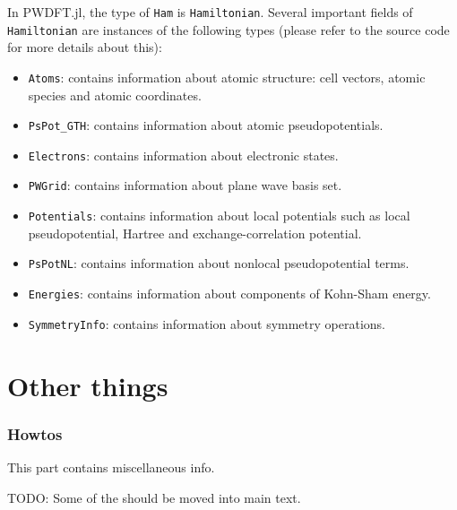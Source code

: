\documentclass[a4paper,fleqn]{article}
\newcommand{\jlinline}[1]{\texttt{#1}}
\begin{document}
In \textsf{PWDFT.jl}, the type of \jlinline{Ham} is \jlinline{Hamiltonian}.
Several important fields of \jlinline{Hamiltonian} are instances of the following
types (please refer to the source code for more details about this):
\begin{itemize}
\item \jlinline{Atoms}: contains information about atomic structure: cell
vectors, atomic species and atomic coordinates.
\item \jlinline{PsPot_GTH}: contains information about atomic pseudopotentials.
\item \jlinline{Electrons}: contains information about electronic states.
\item \jlinline{PWGrid}: contains information about plane wave basis set.
\item \jlinline{Potentials}: contains information about local potentials such
as local pseudopotential, Hartree and exchange-correlation potential.
\item \jlinline{PsPotNL}: contains information about nonlocal pseudopotential
terms.
\item \jlinline{Energies}: contains information about components of Kohn-Sham
energy.
\item \jlinline{SymmetryInfo}: contains information about symmetry operations.
\end{itemize}



















\newpage
\part{Other things}

\appendix
\section{Howtos}

This part contains miscellaneous info.

TODO: Some of the should be moved into main text.
\end{document}
